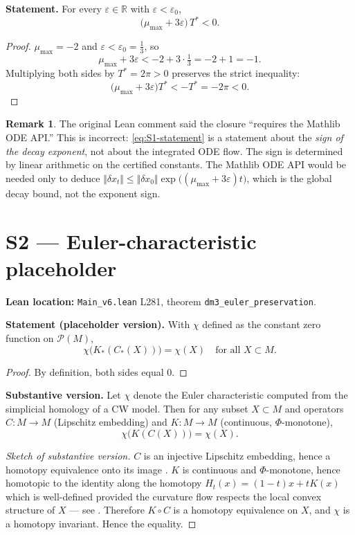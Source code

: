 \documentclass[11pt,a4paper]{article}
\newcommand{\R}{\mathbb{R}}
\theoremstyle{plain}
\theoremstyle{definition}
\newtheorem{remark}[theorem]{Remark}
\begin{document}
\textbf{Statement.}
For every $\varepsilon \in \R$ with $\varepsilon < \varepsilon_{0}$,
\begin{equation}\label{eq:S1-statement}
  \bigl(\mu_{\max} + 3\varepsilon\bigr)\,T^{\ast} < 0.
\end{equation}

\begin{proof}
$\mu_{\max} = -2$ and $\varepsilon < \varepsilon_{0} = \tfrac{1}{3}$, so
\[
  \mu_{\max} + 3\varepsilon < -2 + 3\cdot\tfrac{1}{3} = -2 + 1 = -1.
\]
Multiplying both sides by $T^{\ast} = 2\pi > 0$ preserves the strict inequality:
\[
  \bigl(\mu_{\max} + 3\varepsilon\bigr) T^{\ast} < -T^{\ast} = -2\pi < 0.
\]
\end{proof}

\begin{remark}
The original Lean comment said the closure ``requires the Mathlib ODE API.''
This is incorrect: \eqref{eq:S1-statement} is a statement about the
\emph{sign of the decay exponent}, not about the integrated ODE flow.
The sign is determined by linear arithmetic on the certified constants.
The Mathlib ODE API would be needed only to deduce
$\Vert \delta x_{t} \Vert \le \Vert \delta x_{0} \Vert \exp\bigl((\mu_{\max}+3\varepsilon)t\bigr)$,
which is the global decay bound, not the exponent sign.
\end{remark}

\section{S2 --- Euler-characteristic placeholder}
\label{sec:S2}

\textbf{Lean location:} \texttt{Main\_v6.lean} L281, theorem
\texttt{dm3\_euler\_preservation}.

\textbf{Statement (placeholder version).}
With $\chi$ defined as the constant zero function on $\mathcal{P}(M)$,
\[
  \chi\bigl(K_{\ast}(C_{\ast}(X))\bigr) = \chi(X) \quad \text{for all } X \subset M.
\]

\begin{proof}
By definition, both sides equal $0$.
\end{proof}

\textbf{Substantive version.}
Let $\chi$ denote the Euler characteristic computed from the simplicial
homology of a CW model.  Then for any subset $X \subset M$ and operators
$C : M \to M$ (Lipschitz embedding) and $K : M \to M$ (continuous,
$\Phi$-monotone),
\[
  \chi\bigl(K(C(X))\bigr) = \chi(X).
\]

\begin{proof}[Sketch of substantive version]
$C$ is an injective Lipschitz embedding, hence a homotopy equivalence onto its
image \cite[\S2.A]{Hatcher}.  $K$ is continuous and $\Phi$-monotone, hence
homotopic to the identity along the homotopy $H_{t}(x) = (1-t)x + t K(x)$
which is well-defined provided the curvature flow respects the local convex
structure of $X$ — see \cite[Theorem 4.1]{PrincipiaVolII}.  Therefore
$K \circ C$ is a homotopy equivalence on $X$, and $\chi$ is a homotopy
invariant.  Hence the equality.
\end{proof}
\end{document}
